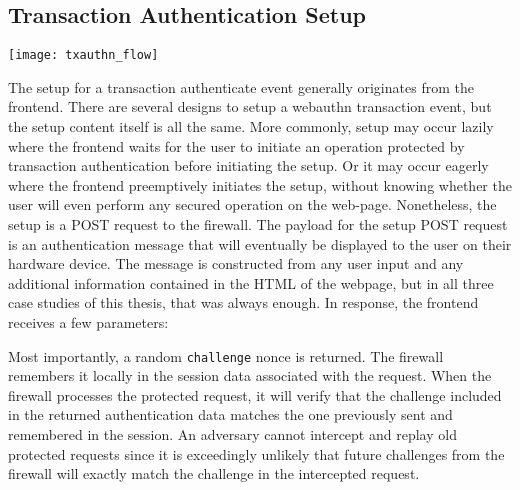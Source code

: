 \subsection{Transaction Authentication Setup}\label{Sec:TransactionAuthenticationSetup}

\begin{center}
\texttt{[image: txauthn\_flow]}
\end{center}


The setup for a transaction authenticate event generally originates from the frontend. There are several designs to setup a webauthn transaction event, but the setup content itself is all the same. More commonly, setup may occur lazily where the frontend waits for the user to initiate an operation protected by transaction authentication before initiating the setup. Or it may occur eagerly where the frontend preemptively initiates the setup, without knowing whether the user will even perform any secured operation on the web-page. Nonetheless, the setup is a POST request to the firewall. The payload for the setup POST request is an authentication message that will eventually be displayed to the user on their hardware device. The message is constructed from any user input and any additional information contained in the HTML of the webpage, but in all three case studies of this thesis, that was always enough. In response, the frontend receives a few parameters:


Most importantly, a random \lstinline{challenge} nonce is returned. The firewall remembers it locally in the session data associated with the request. When the firewall processes the protected request, it will verify that the challenge included in the returned authentication data matches the one previously sent and remembered in the session. An adversary cannot intercept and replay old protected requests since it is exceedingly unlikely that future challenges from the firewall will exactly match the challenge in the intercepted request. 

